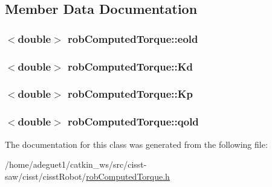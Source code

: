 \subsection{Member Data Documentation}
\hypertarget{classrob_computed_torque_a3cd2783e3f990cbfb633769b022e66c3}{
\subsubsection[{eold}]{$<$double$>$ rob\-Computed\-Torque\-::eold\hspace{0.3cm}{\ttfamily [protected]}}}\label{classrob_computed_torque_a3cd2783e3f990cbfb633769b022e66c3}
\hypertarget{classrob_computed_torque_acb199d8b884ccc02c1d47900c587eb79}{
\subsubsection[{Kd}]{$<$double$>$ rob\-Computed\-Torque\-::\-Kd\hspace{0.3cm}{\ttfamily [protected]}}}\label{classrob_computed_torque_acb199d8b884ccc02c1d47900c587eb79}
\hypertarget{classrob_computed_torque_a11a6fdb06f86a2b81402c1c872c23484}{
\subsubsection[{Kp}]{$<$double$>$ rob\-Computed\-Torque\-::\-Kp\hspace{0.3cm}{\ttfamily [protected]}}}\label{classrob_computed_torque_a11a6fdb06f86a2b81402c1c872c23484}
\hypertarget{classrob_computed_torque_ad528baead484f2d409ac574a83300e1a}{
\subsubsection[{qold}]{$<$double$>$ rob\-Computed\-Torque\-::qold\hspace{0.3cm}{\ttfamily [protected]}}}\label{classrob_computed_torque_ad528baead484f2d409ac574a83300e1a}


The documentation for this class was generated from the following file\-:\begin{DoxyCompactItemize}
\item 
/home/adeguet1/catkin\-\_\-ws/src/cisst-\/saw/cisst/cisst\-Robot/\hyperlink{rob_computed_torque_8h}{rob\-Computed\-Torque.\-h}\end{DoxyCompactItemize}
